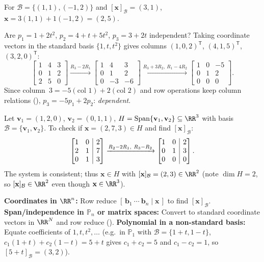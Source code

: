 \documentclass[10pt]{scrartcl}
\makeatletter
\newcommand{\aug}[2]{\left[\begin{array}{@{}#1@{}}#2\end{array}\right]}
\newcommand{\vv}[1]{\mathbf{#1}}
\DeclareMathOperator{\spn}{Span}\DeclareMathOperator{\Nul}{Nul}\DeclareMathOperator{\Col}{Col}\DeclareMathOperator{\Row}{Row}\DeclareMathOperator{\tr}{tr}
\makeatother
\begin{document}
\begin{example*}
For $\mathcal B=\{(1,1),(-1,2)\}$ and $[\vv x]_{\mathcal B}=(3,1)$, $\vv x=3(1,1)+1(-1,2)=(2,5)$.
\end{example*}

\begin{example*}
Are $p_1=1+2t^2$, $p_2=4+t+5t^2$, $p_3=3+2t$ independent? Taking coordinate vectors in the standard basis $\{1,t,t^2\}$ gives columns $(1,0,2)^{\mathsf T}$, $(4,1,5)^{\mathsf T}$, $(3,2,0)^{\mathsf T}$:
    \[
      \begin{bmatrix}1&4&3\\0&1&2\\2&5&0\end{bmatrix}
      \xrightarrow{R_3-2R_1}
      \begin{bmatrix}1&4&3\\0&1&2\\0&-3&-6\end{bmatrix}
      \xrightarrow{R_3+3R_2,\ R_1-4R_2}
      \begin{bmatrix}1&0&-5\\0&1&2\\0&0&0\end{bmatrix}.
    \]
Since column~$3 = -5(\text{col }1)+2(\text{col }2)$ and row operations keep column relations (), $p_3=-5p_1+2p_2$: \emph{dependent}.
\end{example*}

\begin{example*}
Let $\vv v_1=(1,2,0)$, $\vv v_2=(0,1,1)$, $H=\spn\{\vv v_1,\vv v_2\}\subseteq\RR^3$ with basis $\mathcal B=\{\vv v_1,\vv v_2\}$. To check if $\vv x=(2,7,3)\in H$ and find $[\vv x]_{\mathcal B}$:
    \[
      \aug{cc|c}{1&0&2\\2&1&7\\0&1&3}
      \xrightarrow{R_2-2R_1,\ R_3-R_2}
      \aug{cc|c}{1&0&2\\0&1&3\\0&0&0}.
    \]
The system is consistent; thus $\vv x\in H$ with $[\vv x]_{\mathcal B}=(2,3)\in\RR^2$ (note $\dim H=2$, so $[\vv x]_{\mathcal B}\in\RR^2$ even though $\vv x\in\RR^3$).
\end{example*}

\begin{shortcuts}
  \ii \textbf{Coordinates in $\RR^n$:} Row reduce $[\,\vv b_1\ \cdots\ \vv b_n\mid \vv x\,]$ to find $[\vv x]_{\mathcal B}$.
  \ii \textbf{Span/independence in $\mathbb P_n$ or matrix spaces:} Convert to standard coordinate vectors in $\RR^N$ and row reduce ().
  \ii \textbf{Polynomial in a non-standard basis:} Equate coefficients of $1,t,t^2,\dots$ (e.g.\ in $\mathbb P_1$ with $\mathcal B=\{1+t,1-t\}$, $c_1(1+t)+c_2(1-t)=5+t$ gives $c_1+c_2=5$ and $c_1-c_2=1$, so $[5+t]_{\mathcal B}=(3,2)$).
\end{shortcuts}
\end{document}
